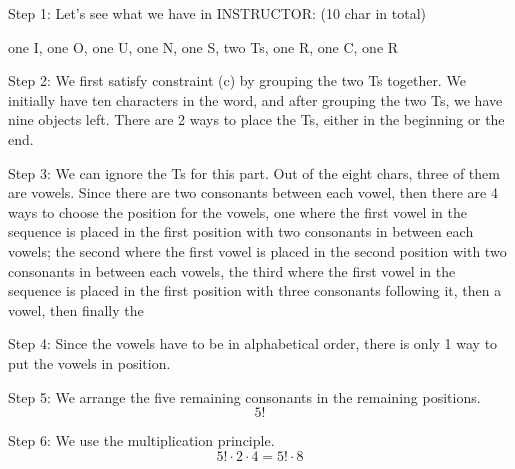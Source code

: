 \documentclass[12pt]{amsart}
\begin{document}
Step 1: Let's see what we have in INSTRUCTOR: (10 char in total)
\smallskip

one I, one O, one U, one N, one S, two Ts, one R, one C,  one R
\smallskip

Step 2: We first satisfy constraint (c) by grouping the two Ts together. We initially have ten characters in the word, and after grouping the two Ts, we have nine objects left. There are 2 ways to place the Ts, either in the beginning or the end. 
\smallskip

Step 3: We can ignore the Ts for this part. Out of the eight chars, three of them are vowels. Since there are two consonants between each vowel, then there are 4 ways to choose the position for the vowels, one where the first vowel in the sequence is placed in the first position with two consonants in between each vowels;  the second where the first vowel is placed in the second position with two consonants in between each vowels, the third where the first vowel in the sequence is placed in the first position with three consonants following it, then a vowel, then finally the 
\smallskip

Step 4: Since the vowels have to be in alphabetical order, there is only 1 way to put the vowels in position. 
\smallskip

Step 5: We arrange the five remaining consonants in the remaining positions. 
\begin{displaymath}
5!
\end{displaymath}
\smallskip

Step 6: We use the multiplication principle.
\begin{displaymath}
5! \cdot 2\cdot 4 ={5!}\cdot 8
\end{displaymath}
\smallskip
\end{document}
